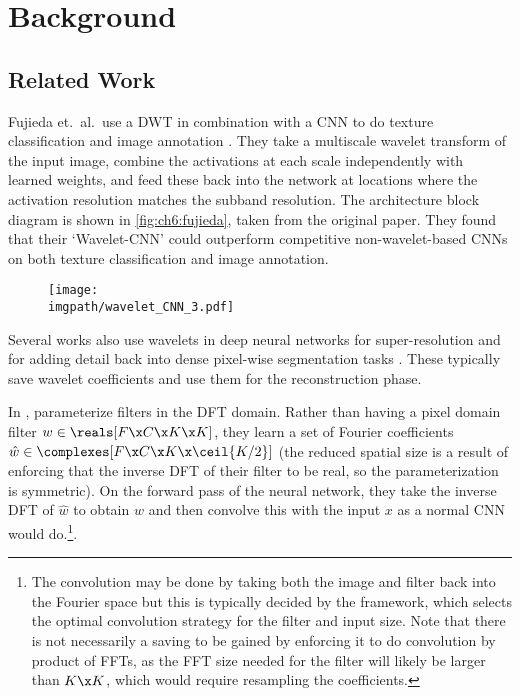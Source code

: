 \section{Background}\label{sec:ch6:background}
\subsection{Related Work}\label{sec:ch6:related} 
Fujieda et.\ al.\ use a DWT in combination with a
CNN to do texture classification and image annotation 
\cite{fujieda_wavelet_2017, fujieda_wavelet_2018}. They take a
multiscale wavelet transform of the input image, combine the activations at each
scale independently with learned weights, and feed these back into the network
at locations where the activation resolution matches the subband resolution. The
architecture block diagram is shown in \autoref{fig:ch6:fujieda}, taken from the
original paper. They found that their `Wavelet-CNN' could
outperform competitive non-wavelet-based CNNs on both texture classification and
image annotation.

\begin{figure}[bt]
  \centering
  \texttt{[image: \\imgpath/wavelet\_CNN\_3.pdf]}
  \label{fig:ch6:fujieda}
\end{figure}

Several works also use wavelets in deep neural networks for super-resolution
\cite{guo_deep_2017} and for adding detail back into dense pixel-wise
segmentation tasks \cite{ma_detailed_2018}. These typically save wavelet
coefficients and use them for the reconstruction phase.

In \cite{rippel_spectral_2015}, \citeauthor{rippel_spectral_2015}
parameterize filters in the DFT domain. Rather than having a pixel domain filter
$w \in \reals[F\x C\x K\x K]$, they learn a set of Fourier coefficients
$\hat{w} \in \complexes[F\x C\x K \x \ceil{K/2}]$
(the reduced spatial size is a result of enforcing that the inverse DFT of their
filter to be real, so the parameterization is symmetric). On the forward pass of
the neural network, they take the inverse DFT of $\hat{w}$ to obtain
$w$ and then convolve this with the input $x$ as a normal CNN
would do.\footnote{The convolution may be done by taking both the image and
filter back into the Fourier space but this is typically decided by the
framework, which selects the optimal convolution strategy for the filter and
input size. Note that there is not necessarily a saving to be gained by
enforcing it to do convolution by product of FFTs, as the FFT size needed for
the filter will likely be larger than $K\x K$, which would require resampling
the coefficients.}. 

